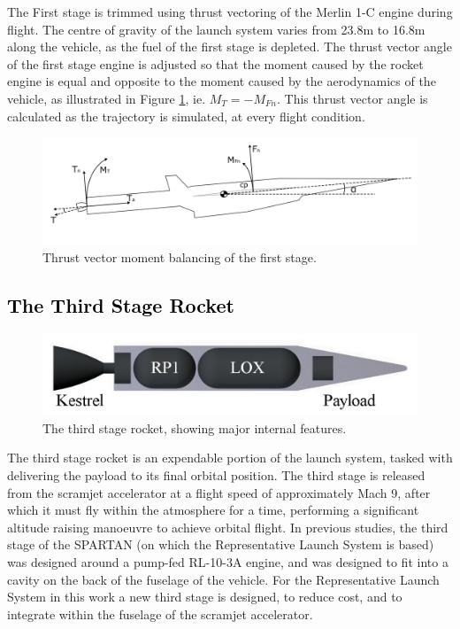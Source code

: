   The First stage is trimmed using thrust vectoring of the Merlin 1-C engine during flight. The centre of gravity of the launch system varies from 23.8m to 16.8m along the vehicle, as the fuel of the first stage is depleted. The thrust vector angle of the first stage engine is adjusted so that the moment caused by the rocket engine is equal and opposite to the moment caused by the aerodynamics of the vehicle, as illustrated in Figure \ref{fig:FirstStageThrustVec}, ie. $M_T = -M_{Fn}$.
  This thrust vector angle is calculated as the trajectory is simulated, at every flight condition. 
\begin{figure}[ht]
\centering
\includegraphics[width=0.9\linewidth]{figures/3_vehicle_design/FirstStageThrustVec}
\caption{Thrust vector moment balancing of the first stage.}
\label{fig:FirstStageThrustVec}
\end{figure}
  
  
	

	\textcolor{black}{\section{The Third Stage Rocket}\label{sec:ThirdStageBaseline}}

	\begin{figure}[ht]
\centering
\includegraphics[width=0.7\linewidth]{figures/3_vehicle_design/3rdStage}
\caption{The third stage rocket, showing major internal features. }
\label{fig:3rdStage}
\end{figure}
\noindent
The third stage rocket is an expendable portion of the launch system, tasked with delivering the payload to its final orbital position. 
  The third stage is released from the scramjet accelerator at a flight speed of approximately Mach 9, after which it must fly within the atmosphere for a time, performing a significant altitude raising manoeuvre to achieve orbital flight\cite{Preller2017b}. 
  In previous studies, the third stage of the SPARTAN (on which the Representative Launch System is based) was designed around a pump-fed RL-10-3A engine\cite{Preller2017b}, and was designed to fit into a cavity on the back of the fuselage of the vehicle\cite{Preller2017b}. For the Representative Launch System in this work a new third stage is designed, to reduce cost, and to integrate within the fuselage of the scramjet accelerator. 
   
